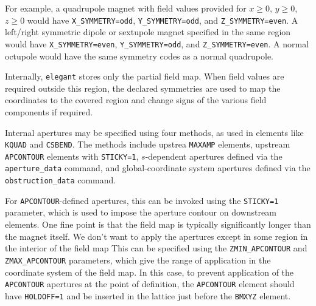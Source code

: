 For example, a quadrupole magnet with field values provided for $x\geq 0$, $y\geq 0$, $z\geq 0$ would have
\verb|X_SYMMETRY=odd|, \verb|Y_SYMMETRY=odd|, and \verb|Z_SYMMETRY=even|.  A left/right symmetric dipole or sextupole
magnet specified in the same region would have \verb|X_SYMMETRY=even|, \verb|Y_SYMMETRY=odd|, and
\verb|Z_SYMMETRY=even|.  A normal octupole would have the same symmetry codes as a normal quadrupole.

Internally, {\tt elegant} stores only the partial field map. When field values are required outside this region, the
declared symmetries are used to map the coordinates to the covered region and change signs of the various field
components if required.

Internal apertures may be specified using four methods, as used in elements like \verb|KQUAD| and
\verb|CSBEND|. The methods include upstrea \verb|MAXAMP| elements, upstream \verb|APCONTOUR| elements
with \verb|STICKY=1|, $s$-dependent apertures defined via the \verb|aperture_data| command,
and global-coordinate system apertures defined via the \verb|obstruction_data| command.

For \verb|APCONTOUR|-defined apertures, this can be invoked using the \verb|STICKY=1| parameter,
which is used to impose the aperture contour on downstream elements.
One fine point is that the field map is typically significantly longer than the magnet itself.
We don't want to apply the apertures except in some region in the interior of the field map
This can be specified using the \verb|ZMIN_APCONTOUR| and \verb|ZMAX_APCONTOUR| parameters,
which give the range of application in the coordinate system of the field map.
In this case, to prevent application of the \verb|APCONTOUR| apertures at the point of 
definition, the \verb|APCONTOUR| element should have \verb|HOLDOFF=1| and be inserted
in the lattice just before the \verb|BMXYZ| element.

